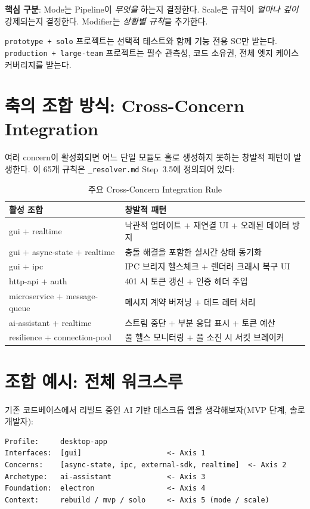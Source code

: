 \documentclass[11pt,a4paper,openright,twoside]{report}
\newcommand{\file}[1]{\texttt{#1}}
\begin{document}
\textbf{핵심 구분}: Mode는 Pipeline이 \emph{무엇을} 하는지 결정한다. Scale은 규칙이 \emph{얼마나 깊이} 강제되는지 결정한다. Modifier는 \emph{상황별 규칙}을 추가한다.

\texttt{prototype + solo} 프로젝트는 선택적 테스트와 함께 기능 전용 SC만 받는다. \texttt{production + large-team} 프로젝트는 필수 관측성, 코드 소유권, 전체 엣지 케이스 커버리지를 받는다.

\section{축의 조합 방식: Cross-Concern Integration}

여러 concern이 활성화되면 어느 단일 모듈도 홀로 생성하지 못하는 창발적 패턴이 발생한다. 이 65개 규칙은 \file{\_resolver.md} Step~3.5에 정의되어 있다:

\begin{table}[H]
\centering
\caption{주요 Cross-Concern Integration Rule}
\label{tab:cross-concern}
\begin{tabularx}{\textwidth}{lX}
\toprule
\textbf{활성 조합} & \textbf{창발적 패턴} \\
\midrule
gui + realtime & 낙관적 업데이트 + 재연결 UI + 오래된 데이터 방지 \\
gui + async-state + realtime & 충돌 해결을 포함한 실시간 상태 동기화 \\
gui + ipc & IPC 브리지 헬스체크 + 렌더러 크래시 복구 UI \\
http-api + auth & 401 시 토큰 갱신 + 인증 헤더 주입 \\
microservice + message-queue & 메시지 계약 버저닝 + 데드 레터 처리 \\
ai-assistant + realtime & 스트림 중단 + 부분 응답 표시 + 토큰 예산 \\
resilience + connection-pool & 풀 헬스 모니터링 + 풀 소진 시 서킷 브레이커 \\
\bottomrule
\end{tabularx}
\end{table}


\section{조합 예시: 전체 워크스루}

기존 코드베이스에서 리빌드 중인 AI 기반 데스크톱 앱을 생각해보자(MVP 단계, 솔로 개발자):

\begin{lstlisting}[title={Domain Profile Example}]
Profile:     desktop-app
Interfaces:  [gui]                    <- Axis 1
Concerns:    [async-state, ipc, external-sdk, realtime]  <- Axis 2
Archetype:   ai-assistant             <- Axis 3
Foundation:  electron                 <- Axis 4
Context:     rebuild / mvp / solo     <- Axis 5 (mode / scale)
\end{lstlisting}
\end{document}
